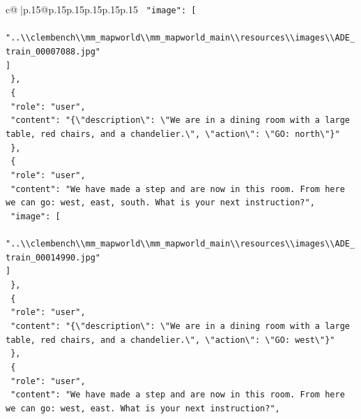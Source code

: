 \documentclass{article}
\begin{document}
{\begin{supertabular}{c@{$\;$}|p{.15\linewidth}@{}p{.15\linewidth}p{.15\linewidth}p{.15\linewidth}p{.15\linewidth}p{.15\linewidth}}
{{{\texttt{    "image": {[}} \\
\texttt{      "..\textbackslash{}\textbackslash{}clembench\textbackslash{}\textbackslash{}mm\_mapworld\textbackslash{}\textbackslash{}mm\_mapworld\_main\textbackslash{}\textbackslash{}resources\textbackslash{}\textbackslash{}images\textbackslash{}\textbackslash{}ADE\_train\_00007088.jpg"} \\
\texttt{    {]}} \\
\texttt{  \},} \\
\texttt{  \{} \\
\texttt{    "role": "user",} \\
\texttt{    "content": "\{\textbackslash{}"description\textbackslash{}": \textbackslash{}"We are in a dining room with a large table, red chairs, and a chandelier.\textbackslash{}", \textbackslash{}"action\textbackslash{}": \textbackslash{}"GO: north\textbackslash{}"\}"} \\
\texttt{  \},} \\
\texttt{  \{} \\
\texttt{    "role": "user",} \\
\texttt{    "content": "We have made a step and are now in this room. From here we can go: west, east, south. What is your next instruction?",} \\
\texttt{    "image": {[}} \\
\texttt{      "..\textbackslash{}\textbackslash{}clembench\textbackslash{}\textbackslash{}mm\_mapworld\textbackslash{}\textbackslash{}mm\_mapworld\_main\textbackslash{}\textbackslash{}resources\textbackslash{}\textbackslash{}images\textbackslash{}\textbackslash{}ADE\_train\_00014990.jpg"} \\
\texttt{    {]}} \\
\texttt{  \},} \\
\texttt{  \{} \\
\texttt{    "role": "user",} \\
\texttt{    "content": "\{\textbackslash{}"description\textbackslash{}": \textbackslash{}"We are in a dining room with a large table, red chairs, and a chandelier.\textbackslash{}", \textbackslash{}"action\textbackslash{}": \textbackslash{}"GO: west\textbackslash{}"\}"} \\
\texttt{  \},} \\
\texttt{  \{} \\
\texttt{    "role": "user",} \\
\texttt{    "content": "We have made a step and are now in this room. From here we can go: west, east. What is your next instruction?",} \\
}}}
\end{supertabular}}
\end{document}
